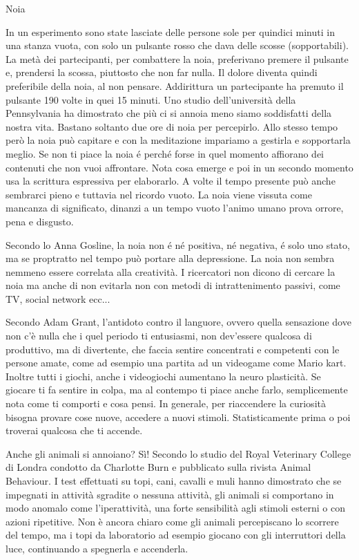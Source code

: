 \documentclass[12pt]{book} %
\begin{document}
\begin{mdframed}[linewidth=1pt]
Noia

In un esperimento sono state lasciate delle persone sole per quindici minuti in una stanza vuota, con solo un pulsante
rosso che dava delle scosse (sopportabili). La metà dei partecipanti, per combattere la noia, preferivano premere il
pulsante e, prendersi la scossa, piuttosto che non far nulla. Il dolore diventa quindi preferibile della noia, al non
pensare. Addirittura un partecipante ha premuto il pulsante 190 volte in quei 15
minuti. Uno studio dell'università della Pennsylvania
ha dimostrato che più ci si annoia meno siamo soddisfatti della nostra vita. Bastano soltanto due ore di noia per
percepirlo. Allo stesso tempo però la noia può capitare e con la meditazione impariamo a gestirla e sopportarla meglio.
Se non ti piace la noia é perché forse in quel momento affiorano dei contenuti che non vuoi affrontare. Nota cosa emerge e poi in un secondo momento usa la scrittura espressiva  per elaborarlo.
A volte il tempo presente può anche sembrarci pieno e tuttavia nel ricordo vuoto. La noia viene vissuta come mancanza
di significato, dinanzi a un tempo vuoto l'animo umano prova orrore, pena e disgusto.

Secondo lo Anna Gosline, la noia non é né positiva, né negativa, é solo uno stato, ma se proptratto nel tempo può portare alla depressione. La noia non sembra nemmeno essere correlata alla creatività. 
I ricercatori non dicono di cercare la noia ma anche di non evitarla non con metodi di intrattenimento passivi, come TV, social network ecc...

Secondo Adam Grant, l'antidoto contro il languore, ovvero quella sensazione dove non c'è nulla che i quel periodo ti
entusiasmi, non dev'essere qualcosa di produttivo, ma di divertente, che faccia sentire concentrati e competenti con le
persone amate, come ad esempio una partita ad un videogame come Mario
kart. Inoltre tutti i giochi, anche i videogiochi aumentano la neuro plasticità. Se giocare ti fa sentire in colpa, ma al
contempo ti piace anche farlo, semplicemente nota come ti comporti e cosa pensi. In generale, per riaccendere la curiosità bisogna provare cose nuove, accedere a nuovi stimoli. Statisticamente prima o poi troverai qualcosa che ti accende.

Anche gli animali si annoiano? Sì! Secondo lo studio del Royal Veterinary College di Londra condotto da Charlotte Burn e
pubblicato sulla rivista Animal Behaviour. I test effettuati su topi, cani, cavalli e muli hanno dimostrato che se
impegnati in attività sgradite o nessuna attività, gli animali si comportano in modo anomalo come l'iperattività, una
forte sensibilità agli stimoli esterni o con azioni ripetitive. Non è ancora chiaro come gli animali percepiscano lo
scorrere del tempo, ma i topi da laboratorio ad esempio giocano con gli interruttori della luce, continuando a
spegnerla e accenderla. 
\end{mdframed}
\end{document}
